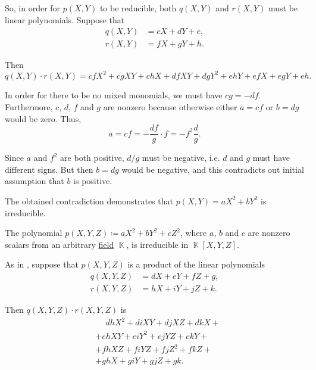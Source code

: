 \begin{example}
\begin{thmenum}
    So, in order for \( p(X, Y) \) to be reducible, both \( q(X, Y) \) and \( r(X, Y) \) must be linear polynomials. Suppose that
    \begin{align*}
      q(X, Y) &= c X + d Y + e, \\
      r(X, Y) &= f X + g Y + h.
    \end{align*}

    Then
    \begin{equation*}
      q(X, Y) \cdot r(X, Y) = c f X^2 + c g X Y + c h X + d f X Y + d g Y^2 + e h Y + e f X + e g Y + e h.
    \end{equation*}

    In order for there to be no mixed monomials, we must have \( c g = - d f \). Furthermore, \( c \), \( d \), \( f \) and \( g \) are nonzero because otherwise either \( a = c f \) or \( b = d g \) would be zero. Thus,
    \begin{equation*}
      a = c f = - \frac {df} g \cdot f = -f^2 \frac d g.
    \end{equation*}

    Since \( a \) and \( f^2 \) are both positive, \( d / g \) must be negative, i.e. \( d \) and \( g \) must have different signs. But then \( b = d g \) would be negative, and this contradicts out initial assumption that \( b \) is positive.

    The obtained contradiction demonstrates that \( p(X, Y) = a X^2 + b Y^2 \) is irreducible.

     The polynomial \( p(X, Y, Z) \coloneqq a X^2 + b Y^2 + c Z^2 \), where \( a \), \( b \) and \( c \) are nonzero scalars from an arbitrary \hyperref[def:field]{field} \( \BbbK \), is irreducible in \( \BbbK[X, Y, Z] \).

    As in , suppose that \( p(X, Y, Z) \) is a product of the linear polynomials
    \begin{align*}
      q(X, Y, Z) &= d X + e Y + f Z + g, \\
      r(X, Y, Z) &= h X + i Y + j Z + k.
    \end{align*}

    Then \( q(X, Y, Z) \cdot r(X, Y, Z) \) is
    \begin{align*}
      &\phantom{{}+{}}
      d h X^2 + d i X Y + d j X Z + d k X
      + \\ &+
      e h X Y + e i Y^2 + e j Y Z + e k Y
      + \\ &+
      f h X Z + f i Y Z + f j Z^2 + f k Z
      + \\ &+
      g h X + g i Y + g j Z + g k.
    \end{align*}


\end{thmenum}
\end{example}
